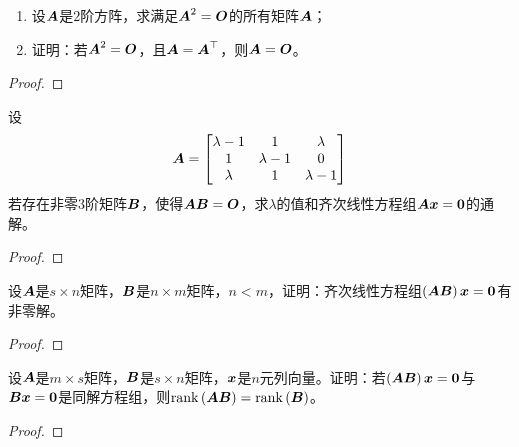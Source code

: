 \begin{problem}
\begin{enumerate}
    \item 设\(\boldsymbol{A}\)是\(2\)阶方阵，求满足\(\boldsymbol{A}^2=\boldsymbol{O}\)的所有矩阵\(\boldsymbol{A}\)；
    \item 证明：若\(\boldsymbol{A}^2=\boldsymbol{O}\)，且\(\boldsymbol{A}=\boldsymbol{A}^\top\)，则\(\boldsymbol{A}=\boldsymbol{O}\)。
\end{enumerate}
\end{problem}
\begin{proof}

\end{proof}

\begin{problem}
设
\begin{equation*}
    \boldsymbol{A}=
    \begin{bmatrix}
        \lambda-1 & 1         & \lambda   \\
        1         & \lambda-1 & 0         \\
        \lambda   & 1         & \lambda-1
    \end{bmatrix}
\end{equation*}
若存在非零\(3\)阶矩阵\(\boldsymbol{B}\)，使得\(\boldsymbol{A}\boldsymbol{B}=\boldsymbol{O}\)，求\(\lambda\)的值和齐次线性方程组\(\boldsymbol{A}\boldsymbol{x}=\boldsymbol{0}\)的通解。
\end{problem}
\begin{proof}

\end{proof}

\begin{problem}
设\(\boldsymbol{A}\)是\(s\times n\)矩阵，\(\boldsymbol{B}\)是\(n\times m\)矩阵，\(n<m\)，证明：齐次线性方程组\(\left( \boldsymbol{A}\boldsymbol{B} \right)\boldsymbol{x}=\boldsymbol{0}\)有非零解。
\end{problem}
\begin{proof}

\end{proof}

\begin{problem}
设\(\boldsymbol{A}\)是\(m\times s\)矩阵，\(\boldsymbol{B}\)是\(s\times n\)矩阵，\(\boldsymbol{x}\)是\(n\)元列向量。证明：若\(\left( \boldsymbol{A}\boldsymbol{B} \right)\boldsymbol{x}=\boldsymbol{0}\)与\(\boldsymbol{B}\boldsymbol{x}=\boldsymbol{0}\)是同解方程组，则\(\mathrm{rank}\left( \boldsymbol{A}\boldsymbol{B} \right)=\mathrm{rank}\left( \boldsymbol{B} \right)\)。
\end{problem}
\begin{proof}

\end{proof}

